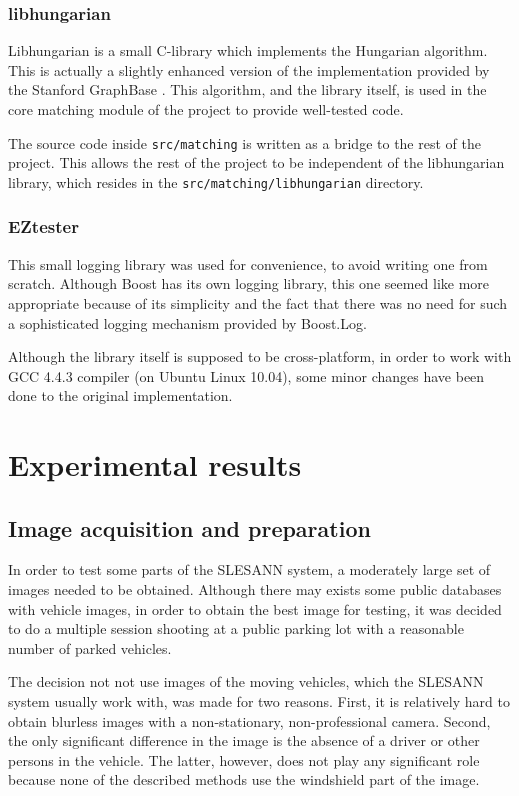 \documentclass[times, utf8, zavrsni]{fer}
\begin{document}
\subsection{libhungarian}

Libhungarian is a small C-library which implements the Hungarian algorithm. This
is actually a slightly enhanced version of the implementation provided by the
Stanford GraphBase \citep{libhungarian:stachnis}. This algorithm, and the
library itself, is used in the core matching module of the project to provide
well-tested code.

The source code inside \texttt{src/matching} is written as a bridge to the rest
of the project. This allows the rest of the project to be independent of the
libhungarian library, which resides in the \texttt{src/matching/libhungarian}
directory.

\subsection{EZtester}
This small logging library was used for convenience, to avoid writing one from
scratch. Although Boost has its own logging library, this one seemed like
more appropriate because of its simplicity and the fact that there was no need
for such a sophisticated logging mechanism provided by Boost.Log.

Although the library itself is supposed to be cross-platform, in order to work
with GCC 4.4.3 compiler (on Ubuntu Linux 10.04), some minor changes have been
done to the original implementation. 

\nocite{ezlogger:overview}

\chapter{Experimental results}

\section{Image acquisition and preparation}

In order to test some parts of the SLESANN system, a moderately large set of
images needed to be obtained. Although there may exists some public databases
with vehicle images, in order to obtain the best image for testing, it was
decided to do a multiple session shooting at a public parking lot with a
reasonable number of parked vehicles.

The decision not not use images of the moving vehicles, which the SLESANN system
usually work with, was made for two reasons. First, it is relatively hard to
obtain blurless images with a non-stationary, non-professional camera. Second,
the only significant difference in the image is the absence of a driver or other
persons in the vehicle. The latter, however, does not play any significant role
because none of the described methods use the windshield part of the image.
\end{document}
